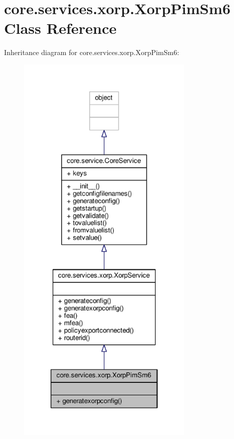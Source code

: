 \hypertarget{classcore_1_1services_1_1xorp_1_1_xorp_pim_sm6}{\section{core.\+services.\+xorp.\+Xorp\+Pim\+Sm6 Class Reference}
\label{classcore_1_1services_1_1xorp_1_1_xorp_pim_sm6}
}


Inheritance diagram for core.\+services.\+xorp.\+Xorp\+Pim\+Sm6\+:
\nopagebreak
\begin{figure}[H]
\begin{center}
\leavevmode
\includegraphics[height=550pt]{classcore_1_1services_1_1xorp_1_1_xorp_pim_sm6__inherit__graph}
\end{center}
\end{figure}


